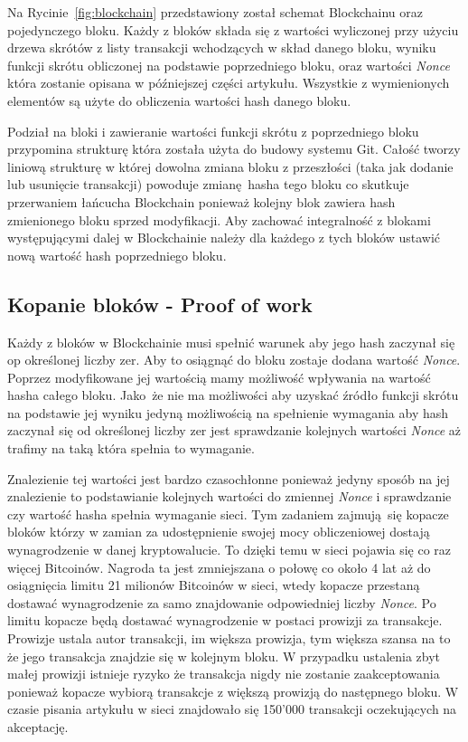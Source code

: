 \documentclass[conference]{IEEEtran}
\begin{document}
Na Rycinie~\ref{fig:blockchain} przedstawiony został schemat Blockchainu oraz pojedynczego bloku. Każdy z bloków składa
się z wartości wyliczonej przy użyciu drzewa skrótów z listy transakcji wchodzących w skład danego bloku, wyniku funkcji
skrótu obliczonej na podstawie poprzedniego bloku, oraz wartości \textit{Nonce} która zostanie opisana w późniejszej
części artykułu. Wszystkie z wymienionych elementów są użyte do obliczenia wartości hash danego bloku.

Podział na bloki i zawieranie wartości funkcji skrótu z poprzedniego bloku przypomina strukturę która została użyta do
budowy systemu Git\cite{git}. Całość tworzy liniową strukturę w której dowolna zmiana bloku z przeszłości (taka jak
dodanie lub usunięcie transakcji) powoduje zmianę hasha tego bloku co skutkuje przerwaniem łańcucha Blockchain ponieważ
kolejny blok zawiera hash zmienionego bloku sprzed modyfikacji. Aby zachować integralność z blokami występującymi dalej
w Blockchainie należy dla każdego z tych bloków ustawić nową wartość hash poprzedniego bloku.

\subsection{Kopanie bloków - Proof of work}

Każdy z bloków w Blockchainie musi spełnić warunek aby jego hash zaczynał się op określonej liczby zer. Aby to osiągnąć
do bloku zostaje dodana wartość \textit{Nonce}. Poprzez modyfikowane jej wartością mamy możliwość wpływania na wartość
hasha całego bloku. Jako że nie ma możliwości aby uzyskać źródło funkcji skrótu na podstawie jej wyniku jedyną
możliwością na spełnienie wymagania aby hash zaczynał się od określonej liczby zer jest sprawdzanie kolejnych wartości
\textit{Nonce} aż trafimy na taką która spełnia to wymaganie.

Znalezienie tej wartości jest bardzo czasochłonne ponieważ jedyny sposób na jej znalezienie to podstawianie kolejnych
wartości do zmiennej \textit{Nonce} i sprawdzanie czy wartość hasha spełnia wymaganie sieci. Tym zadaniem zajmują się
kopacze bloków którzy w zamian za udostępnienie swojej mocy obliczeniowej dostają wynagrodzenie w danej kryptowalucie.
To dzięki temu w sieci pojawia się co raz więcej Bitcoinów. Nagroda ta jest zmniejszana o połowę co około 4 lat aż do
osiągnięcia limitu 21 milionów Bitcoinów w sieci, wtedy kopacze przestaną dostawać wynagrodzenie za samo znajdowanie
odpowiedniej liczby \textit{Nonce}. Po limitu kopacze będą dostawać wynagrodzenie w postaci prowizji za transakcje.
Prowizje ustala autor transakcji, im większa prowizja, tym większa szansa na to że jego transakcja znajdzie się w
kolejnym bloku. W przypadku ustalenia zbyt małej prowizji istnieje ryzyko że transakcja nigdy nie zostanie
zaakceptowania ponieważ kopacze wybiorą transakcje z większą prowizją do następnego bloku. W czasie pisania artykułu w
sieci znajdowało się 150'000 transakcji oczekujących na akceptację\cite{niezatwierdzoneTransakcje}.
\end{document}
